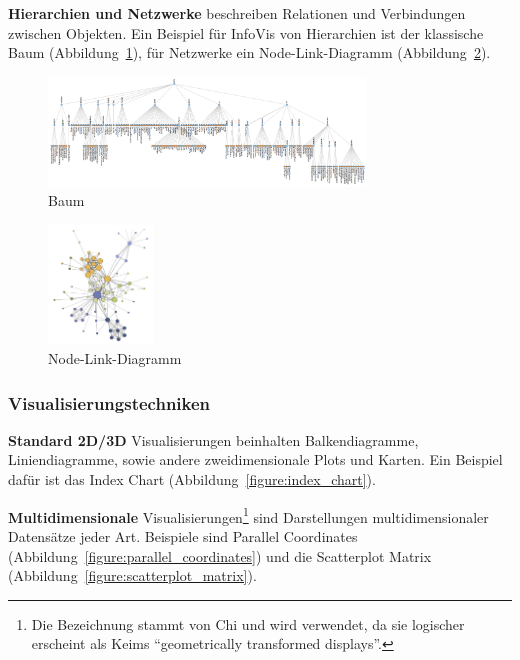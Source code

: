 \documentclass[
	headsepline,
	footsepline,
	fontsize=12pt,
	bibliography=totoc
]{scrbook}
\begin{document}
\textbf{Hierarchien und Netzwerke} beschreiben Relationen und Verbindungen zwischen Objekten. Ein Beispiel für InfoVis von Hierarchien ist der klassische Baum (Abbildung~\ref{figure:baum}), für Netzwerke ein Node-Link-Diagramm (Abbildung~\ref{figure:node-link-diagramm}).

\begin{figure}[htbp]
   \centering
   \includegraphics[width=0.75\textwidth]{images/grundlagen-baum.png}
   \caption{Baum}
   \label{figure:baum}
\end{figure}

\begin{figure}[htbp]
   \centering
   \includegraphics[width=0.25\textwidth]{images/grundlagen-node-link-diagramm.png}
   \caption{Node-Link-Diagramm}
   \label{figure:node-link-diagramm}
\end{figure}


\subsubsection{Visualisierungstechniken}
\label{section:Visualisierungstechniken}


\textbf{Standard 2D/3D} Visualisierungen beinhalten Balkendiagramme, Liniendiagramme, sowie andere zweidimensionale Plots und Karten. Ein Beispiel dafür ist das Index Chart (Abbildung~\ref{figure:index_chart}).

\textbf{Multidimensionale} Visualisierungen\footnote{Die Bezeichnung stammt von Chi \cite{Chi2000} und wird verwendet, da sie logischer erscheint als Keims \enquote{geometrically transformed displays}.} sind Darstellungen multidimensionaler Datensätze jeder Art. Beispiele sind Parallel Coordinates (Abbildung~\ref{figure:parallel_coordinates}) und die Scatterplot Matrix (Abbildung~\ref{figure:scatterplot_matrix}).
\end{document}
